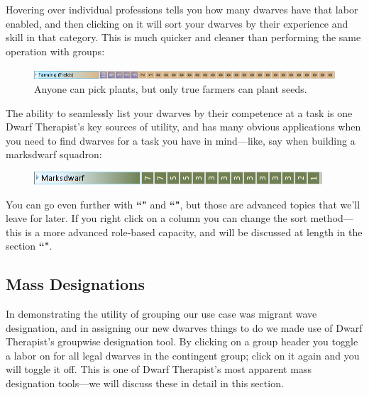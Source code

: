 \documentclass[]{article}
\begin{document}
Hovering over individual professions tells you how many dwarves have that labor enabled, and then
clicking on it will sort your dwarves by their experience and skill in that category. This is much
quicker and cleaner than performing the same operation with groups:
\begin{figure}[h!]
\centering
\includegraphics[width=\linewidth]{Sec2Fig11}
\caption{Anyone can pick plants, but only true farmers can plant seeds.}
\end{figure}

The ability to seamlessly list your dwarves by their competence at a task is one Dwarf Therapist's key
sources of utility, and has many obvious applications when you need to find dwarves for a task you have
in mind---like, say when building a marksdwarf squadron:
\begin{figure}[h!]
\centering
\includegraphics[scale=.9]{Sec2Fig12}
\end{figure}

You can go even further with \textbf{``"} and
\textbf{``"}, but those are advanced topics that we'll leave for later. If you right
click on a column you can change the sort method---this is a more advanced role-based capacity, and will
be discussed at length in the section \textbf{``"}.

\newpage

\subsection{Mass Designations}
\label{sec:Mass Designations}
In demonstrating the utility of grouping our use case was migrant wave designation, and in assigning our
new dwarves things to do we made use of Dwarf Therapist's groupwise designation tool. By clicking on a
group header you toggle a labor on for all legal dwarves in the contingent group; click on it again and
you will toggle it off. This is one of Dwarf Therapist's most apparent mass designation tools---we will
discuss these in detail in this section.
\end{document}
